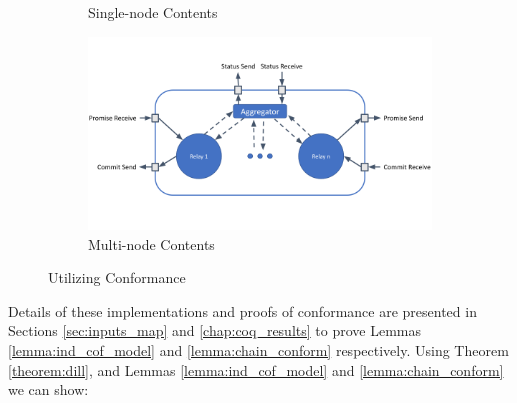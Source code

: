 \documentclass[runningheads]{llncs}
\begin{document}
\begin{figure}
\begin{subfigure}[b]{0.4\textwidth}
         \caption{Single-node Contents}
         \label{fig:singlenodebox}
     \end{subfigure}
     \hfill
     \begin{subfigure}[b]{0.4\textwidth}
         \centering
         \includegraphics[width=1.4\textwidth]{paper/MultiNodeBlackBox.png}
         \caption{Multi-node Contents}
        \label{fig:multinodebox}
     \end{subfigure}
        \caption{Utilizing Conformance}
         \label{fig:allblackbox}
\end{figure}



Details of these implementations and proofs of conformance are presented in Sections \ref{sec:inputs_map} and \ref{chap:coq_results} to prove 
Lemmas \ref{lemma:ind_cof_model} and \ref{lemma:chain_conform} respectively.
Using Theorem \ref{theorem:dill}, and Lemmas \ref{lemma:ind_cof_model} and \ref{lemma:chain_conform} we can show:
\end{document}

